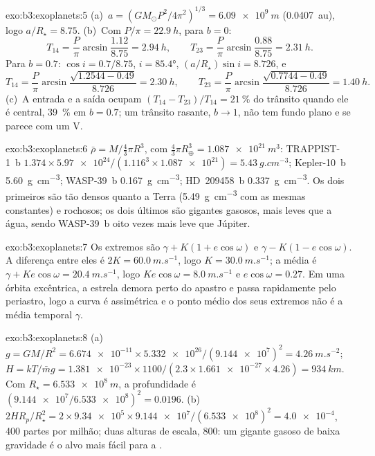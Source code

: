 \begin{solution}{exo:b3:exoplanets:5}
(a)~$a = (GM_\odot P^2/4\pi^2)^{1/3} = \qty{6.09e9}{m}$ (\qty{0.0407}{au}),
logo $a/R_\star = 8.75$. (b)~Com $P/\pi = \qty{22.9}{h}$, para $b = 0$:
\[
T_{14} = \frac P\pi\arcsin\frac{1.12}{8.75} = \qty{2.94}{h}, \qquad
T_{23} = \frac P\pi\arcsin\frac{0.88}{8.75} = \qty{2.31}{h}.
\]
Para $b = 0.7$: $\cos i = 0.7/8.75$, $i = \ang{85.4}$, $(a/R_\star)\sin i =
8.726$, e
\[
T_{14} = \frac P\pi\arcsin\frac{\sqrt{1.2544 - 0.49}}{8.726} = \qty{2.30}{h},
\qquad
T_{23} = \frac P\pi\arcsin\frac{\sqrt{0.7744 - 0.49}}{8.726} = \qty{1.40}{h}.
\]
(c)~A entrada e a saída ocupam $(T_{14} - T_{23})/T_{14} = \qty{21}{\percent}$
do trânsito quando ele é central, \qty{39}{\percent} em $b = 0.7$; um
trânsito rasante, $b \to 1$, não tem fundo plano e se parece com um V.
\end{solution}

\begin{solution}{exo:b3:exoplanets:6}
$\bar\rho = M/\tfrac43\pi R^3$, com $\tfrac43\pi R_\oplus^3 =
\qty{1.087e21}{m^3}$: TRAPPIST-1~b $1.374\times\num{5.97e24}/(1.116^3\times
\num{1.087e21}) = \qty{5.43}{g.cm^{-3}}$; Kepler-10~b
\qty{5.60}{g.cm^{-3}}; WASP-39~b \qty{0.167}{g.cm^{-3}}; HD~209458~b
\qty{0.337}{g.cm^{-3}}. Os dois primeiros são tão densos quanto a Terra
(\qty{5.49}{g.cm^{-3}} com as mesmas constantes) e rochosos; os dois últimos
são gigantes gasosos, mais leves que a água, sendo WASP-39~b oito vezes mais leve que
Júpiter.
\end{solution}

\begin{solution}{exo:b3:exoplanets:7}
Os extremos são $\gamma + K(1 + e\cos\omega)$ e $\gamma - K(1 -
e\cos\omega)$. A diferença entre eles é $2K = \qty{60.0}{m.s^{-1}}$, logo $K =
\qty{30.0}{m.s^{-1}}$; a média é $\gamma + Ke\cos\omega =
\qty{20.4}{m.s^{-1}}$, logo $Ke\cos\omega = \qty{8.0}{m.s^{-1}}$ e
$e\cos\omega = 0.27$. Em uma órbita excêntrica, a estrela demora perto do
apastro e passa rapidamente pelo periastro, logo a curva é assimétrica e o
ponto médio dos seus extremos não é a média temporal $\gamma$.
\end{solution}

\begin{solution}{exo:b3:exoplanets:8}
(a)~$g = GM/R^2 = \num{6.674e-11}\times\num{5.332e26}/(\num{9.144e7})^2 =
\qty{4.26}{m.s^{-2}}$; $H = kT/\bar m g = \num{1.381e-23}\times1100/(2.3
\times\num{1.661e-27}\times4.26) = \qty{934}{km}$. Com $R_\star =
\qty{6.533e8}{m}$, a profundidade é $(\num{9.144e7}/\num{6.533e8})^2 =
\num{0.0196}$. (b)~$2HR_p/R_\star^2 = 2\times\num{9.34e5}\times
\num{9.144e7}/(\num{6.533e8})^2 = \num{4.0e-4}$, 400 partes por milhão;
duas alturas de escala, 800: um gigante gasoso de baixa gravidade é o alvo
mais fácil para a .
\end{solution}

